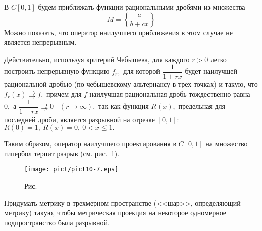  \begin{Example} %
В $C[0,1]$ будем приближать функции рациональными дробями из множества
 $$
 M=\left\{ \frac{a}{b+cx}\right\}
 $$
 Можно показать, что оператор наилучшего приближения в этом случае не является непрерывным.

 Действительно, используя критерий Чебышева, для каждого $r>0$ легко построить
 непрерывную функцию $f_r,$ для которой $\dfrac{1}{1+rx}$
 будет наилучшей рациональной дробью (по чебышевскому
 альтернансу в трех точках)
 и такую, что $f_r(x) \rightrightarrows f,$ причем
 для $f$ наилучшая рациональная дробь тождественно равна $0,$ а $\dfrac{1}{1+rx}
 \not\rightrightarrows 0$~ $(r\to \infty),$ так как
 функция $R(x),$ предельная для последней дроби, является разрывной на
 отрезке $[0,1]$: $R(0)=1,\ R(x)=0,\ 0< x\le 1.$

 Таким образом, оператор {наилучшего} проектирования в $C[0,1]$ на {множество} гипербол терпит
 разрыв (см. рис.~\ref{r10-7}).
 \end{Example}

\begin{figure}[h]
\begin{center}
\texttt{[image: pict/pict10-7.eps]}
\end{center}
\bigskip
{}\label{r10-7}

\centerline{Рис.~\theris}
\end{figure}

\begin{ex}
 Придумать метрику в трехмерном пространстве (<<шар>>, определяющий
 метрику) такую, чтобы метрическая проекция на некоторое
 одномерное подпространство была разрывной.
\end{ex}
